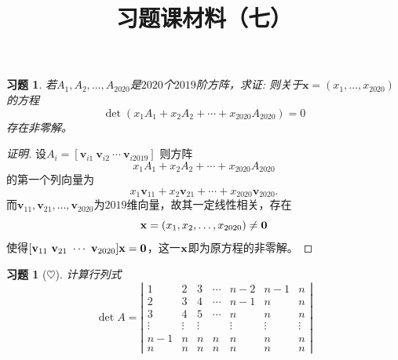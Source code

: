 \documentclass[UTF8]{ctexart}
\newtheorem{ex}[thm]{习题}
\begin{document}
\title{习题课材料（七）}

\date{}

\maketitle

\vspace{-1cm}









\begin{ex}
若$A_1, A_2, \ldots, A_{2020}$是$2020$个$2019$阶方阵，求证: 则关于$\mathbf{x}=(x_1,\ldots ,x_{2020})$的方程$$\det \left(x_1A_1+x_2A_2+\cdots +x_{2020}A_{2020}\right)=0$$存在非零解。
\end{ex}
\begin{proof}[证明]设$A_i=[\mathbf{v}_{i1}\ \mathbf{v}_{i2}\ \cdots\ \mathbf{v}_{i2019}]$
则方阵
$$
x_1A_1+x_2A_2+\cdots +x_{2020}A_{2020}
$$
的第一个列向量为
$$
x_1\mathbf{v}_{11}+x_2\mathbf{v}_{21}+\cdots +x_{2020}\mathbf{v}_{2020}.
$$
而$\mathbf{v}_{11},\mathbf{v}_{21},\ldots ,\mathbf{v}_{2020}$为$2019$维向量，故其一定线性相关，存在
$$
{\bf x}=(x_1, x_2,\ldots, x_{2020})\ne\bf 0
$$
使得$[\mathbf{v}_{11}\ \mathbf{v}_{21}\ \cdots\ \mathbf{v}_{2020}]{\bf x}={\bf 0}$，这一${\bf x}$即为原方程的非零解。
\end{proof}

\begin{ex}[$\heartsuit $]
	计算行列式
$$\det A=\left|\begin{array}{ccccccc}
                 1 & 2 & 3 & \cdots & n-2 & n-1 & n \\
                 2 & 3 & 4 & \cdots & n-1 & n & n \\
                 3 & 4 & 5 & \cdots & n & n & n \\
                 \vdots & \vdots & \vdots &  & \vdots & \vdots & \vdots \\
                 n-1 & n & n & n & n & n & n \\
                 n & n & n & n & n & n & n
               \end{array}
\right|$$
\end{ex}
\end{document}
